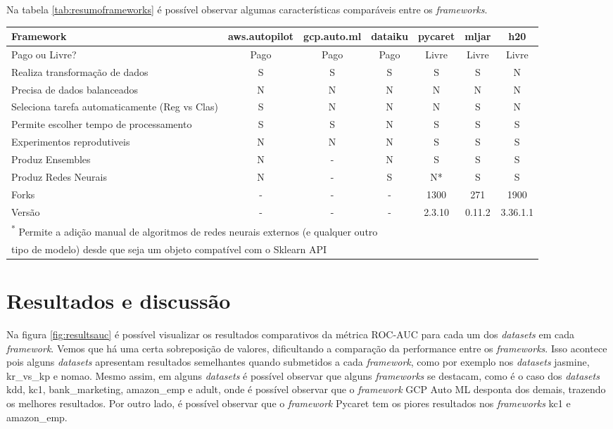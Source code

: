 \documentclass[9pt, a4paper, twocolumn]{article}
\begin{document}
Na tabela \ref{tab:resumoframeworks} é possível observar algumas características comparáveis entre os \emph{frameworks}.

\begin{table*}

\caption{\label{tab:resumoframeworks}Resumo das Características dos Frameworks}
\centering
\fontsize{8.5}{10.5}\selectfont
\begin{tabular}[t]{lcccccc}
\toprule
Framework & aws.autopilot & gcp.auto.ml & dataiku & pycaret & mljar & h20\\
\midrule
Pago ou Livre? & Pago & Pago & Pago & Livre & Livre & Livre\\
Realiza transformação de dados & S & S & S & S & S & N\\
Precisa de dados balanceados & N & N & N & N & N & N\\
Seleciona tarefa automaticamente (Reg vs Clas) & S & N & N & N & S & N\\
Permite escolher tempo de processamento & S & S & N & S & S & S\\
\addlinespace
Experimentos reprodutiveis & N & N & N & S & S & S\\
Produz Ensembles & N & - & N & S & S & S\\
Produz Redes Neurais & N & - & S & N* & S & S\\
Forks & - & - & - & 1300 & 271 & 1900\\
Versão & - & - & - & 2.3.10 & 0.11.2 & 3.36.1.1\\
\bottomrule
\multicolumn{7}{l}{\textsuperscript{*} Permite a adição manual de algoritmos de redes neurais externos (e qualquer outro}\\
\multicolumn{7}{l}{tipo de modelo) desde que seja um objeto compatível com o Sklearn API}\\
\end{tabular}
\end{table*}

\hypertarget{resultados-e-discussuxe3o}{%
\section{Resultados e discussão}\label{resultados-e-discussuxe3o}}

Na figura \ref{fig:resultsauc} é possível visualizar os resultados comparativos da métrica ROC-AUC para cada um dos \emph{datasets} em cada \emph{framework}. Vemos que há uma certa sobreposição de valores, dificultando a comparação da performance entre os \emph{frameworks}. Isso acontece pois alguns \emph{datasets} apresentam resultados semelhantes quando submetidos a cada \emph{framework}, como por exemplo nos \emph{datasets} jasmine, kr\_vs\_kp e nomao. Mesmo assim, em alguns \emph{datasets} é possível observar que alguns \emph{frameworks} se destacam, como é o caso dos \emph{datasets} kdd, kc1, bank\_marketing, amazon\_emp e adult, onde é possível observar que o \emph{framework} GCP Auto ML desponta dos demais, trazendo os melhores resultados. Por outro lado, é possível observar que o \emph{framework} Pycaret tem os piores resultados nos \emph{frameworks} kc1 e amazon\_emp.
\end{document}
